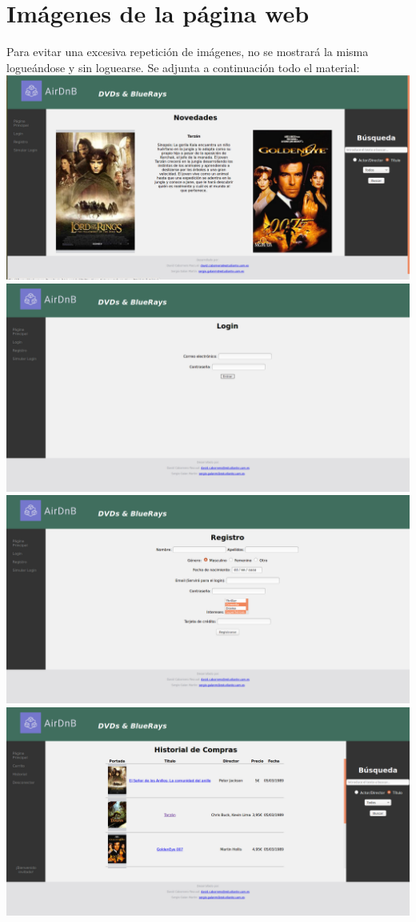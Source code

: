 \documentclass[]{article}
\begin{document}
\section{Imágenes de la página web}
Para evitar una excesiva repetición de imágenes, no se mostrará la misma logueándose y sin loguearse. Se adjunta a continuación todo el material:
\includegraphics[scale=0.2]{html/Menu.png} 
\includegraphics[scale=0.2]{html/Login.png} 
\includegraphics[scale=0.2]{html/Registro.png} 
\includegraphics[scale=0.2]{html/Historial.png} 
\end{document}
